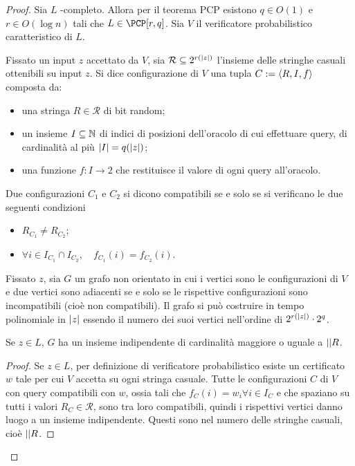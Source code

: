 \begin{proof}
	\newcommand{\Rand}{\mathcal R}
	Sia $L$ \NP-completo. Allora per il teorema PCP esistono $q\in O(1)$ e $r\in O(\log n)$ tali che $L\in\PCP[r,q]$.
	Sia $V$ il verificatore probabilistico caratteristico di $L$.

	Fissato un input $z$ accettato da $V$, sia $\Rand\subseteq 2^{r(\len z)}$ l'insieme delle stringhe casuali ottenibili su input $z$.
	Si dice configurazione di $V$ una tupla $C:=\langle R,I,f \rangle$ composta da:
	\begin{itemize}
		\item una stringa $R\in\Rand$ di bit random;
		\item un insieme $I\subseteq\mathbb N$ di indici di posizioni dell'oracolo di cui effettuare query, di cardinalità al più $| I |=q(|z|)$;
		\item una funzione $f:I\to 2$ che restituisce il valore di ogni query all'oracolo.
	\end{itemize}
	Due configurazioni $C_1$ e $C_2$ si dicono compatibili se e solo se si verificano le due seguenti condizioni
	\begin{itemize}
		\item $R_{C_1}\neq R_{C_2}$;
		\item $\forall i\in I_{C_1}\cap I_{C_2},\quad f_{C_1}(i)=f_{C_2}(i)$.
	\end{itemize}

	Fissato $z$, sia $G$ un grafo non orientato in cui i vertici sono le configurazioni di $V$ e due vertici sono adiacenti se e solo se le rispettive configurazioni sono incompatibili (cioè non compatibili).
	Il grafo si può costruire in tempo polinomiale in $|z|$ essendo il numero dei suoi vertici nell'ordine di $2^{r(|z|)}\cdot 2^q$.

	\begin{fact}\label{fac:indip1}
		Se $z\in L$, $G$ ha un insieme indipendente di cardinalità maggiore o uguale a $\card\Rand$.
	\end{fact}
	\begin{proof}
		Se $z\in L$, per definizione di verificatore probabilistico esiste un certificato $w$ tale per cui $V$ accetta su ogni stringa casuale.
		Tutte le configurazioni $C$ di $V$ con query compatibili con $w$, ossia tali che $f_C(i)=w_i\forall i\in I_C$ e che spaziano su tutti i valori $R_C\in\Rand$, sono tra loro compatibili, quindi i rispettivi vertici danno luogo a un insieme indipendente.
		Questi sono nel numero delle stringhe casuali, cioè $\card\Rand$.
	\end{proof}


\end{proof}
